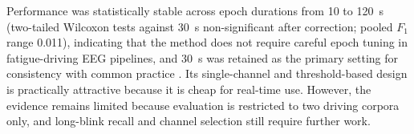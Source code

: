Performance was statistically stable across epoch durations from 10 to 120~s (two-tailed Wilcoxon tests against 30~s non-significant after correction; pooled $F_1$ range 0.011), indicating that the method does not require careful epoch tuning in fatigue-driving EEG pipelines, and 30~s was retained as the primary setting for consistency with common practice \citep{alyan2023blink,tian2021fatigue}. Its single-channel and threshold-based design is practically attractive because it is cheap for real-time use. However, the evidence remains limited because evaluation is restricted to two driving corpora only, and long-blink recall and channel selection still require further work.
